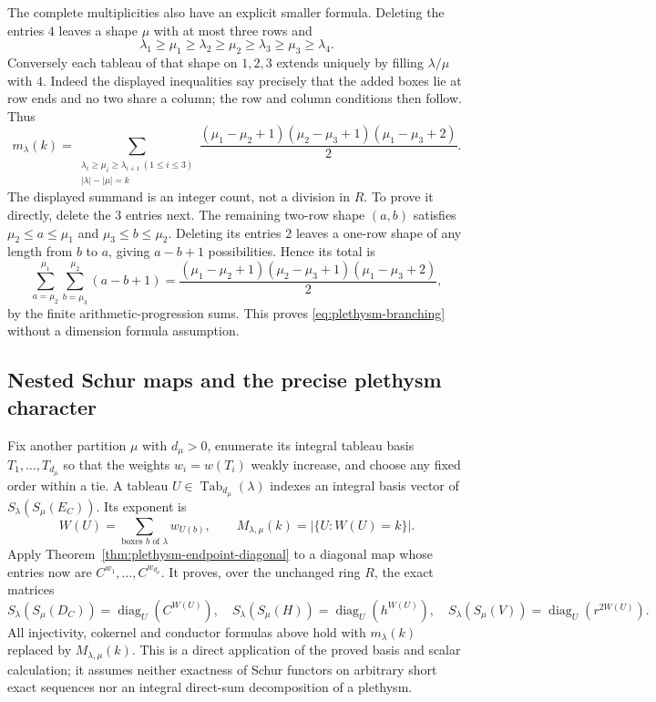 The complete multiplicities also have an explicit smaller formula.
Deleting the entries $4$ leaves a shape $\mu$ with at most three rows
and
\[
 \lambda_1\ge\mu_1\ge\lambda_2\ge\mu_2\ge
 \lambda_3\ge\mu_3\ge\lambda_4.
\]
Conversely each tableau of that shape on $1,2,3$ extends uniquely by
filling $\lambda/\mu$ with $4$. Indeed the displayed inequalities say
precisely that the added boxes lie at row ends and no two share a
column; the row and column conditions then follow. Thus
\begin{equation}\label{eq:plethysm-branching}
 m_\lambda(k)=
 \sum_{\substack{\lambda_i\ge\mu_i\ge\lambda_{i+1}\ (1\le i\le3)\\
                  |\lambda|-|\mu|=k}}
 \frac{(\mu_1-\mu_2+1)(\mu_2-\mu_3+1)(\mu_1-\mu_3+2)}2.
\end{equation}
The displayed summand is an integer count, not a division in $R$.
To prove it directly, delete the $3$ entries next. The remaining
two-row shape $(a,b)$ satisfies
$\mu_2\le a\le\mu_1$ and $\mu_3\le b\le\mu_2$.
Deleting its entries $2$ leaves a one-row shape of any length from
$b$ to $a$, giving $a-b+1$ possibilities. Hence its total is
\[
 \sum_{a=\mu_2}^{\mu_1}\sum_{b=\mu_3}^{\mu_2}(a-b+1)
 =\frac{(\mu_1-\mu_2+1)(\mu_2-\mu_3+1)(\mu_1-\mu_3+2)}2,
\]
by the finite arithmetic-progression sums. This proves
\eqref{eq:plethysm-branching} without a dimension formula assumption.

\subsection{Nested Schur maps and the precise plethysm character}

Fix another partition $\mu$ with $d_\mu>0$, enumerate its integral
tableau basis $T_1,\ldots,T_{d_\mu}$ so that the weights
$w_i=w(T_i)$ weakly increase, and choose any fixed order within a
tie. A tableau $U\in\operatorname{Tab}_{d_\mu}(\lambda)$ indexes an
integral basis vector of $S_\lambda(S_\mu(E_C))$. Its exponent is
\[
 W(U)=\sum_{\text{boxes }b\text{ of }\lambda}w_{U(b)},\qquad
 M_{\lambda,\mu}(k)=|\{U:W(U)=k\}|.
\]
Apply Theorem~\ref{thm:plethysm-endpoint-diagonal} to a diagonal map
whose entries now are $C^{w_1},\ldots,C^{w_{d_\mu}}$. It proves, over
the unchanged ring $R$, the exact matrices
\begin{equation}\label{eq:plethysm-endpoint-nested-diagonal}
 S_\lambda(S_\mu(D_C))=\operatorname{diag}_{U}(C^{W(U)}),
 \quad S_\lambda(S_\mu(H))=\operatorname{diag}_{U}(h^{W(U)}),
 \quad S_\lambda(S_\mu(V))=\operatorname{diag}_{U}(r^{2W(U)}).
\end{equation}
All injectivity, cokernel and conductor formulas above hold with
$m_\lambda(k)$ replaced by $M_{\lambda,\mu}(k)$. This is a direct
application of the proved basis and scalar calculation; it assumes
neither exactness of Schur functors on arbitrary short exact sequences
nor an integral direct-sum decomposition of a plethysm.

